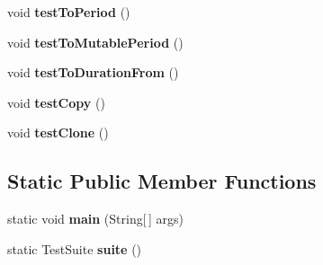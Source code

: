 \begin{DoxyCompactItemize}
\item 
\hypertarget{classorg_1_1joda_1_1time_1_1_test_mutable_period___basics_a323f8a3dbb74562bcab215f4ccd603d5}{void {\bfseries test\-To\-Period} ()}\label{classorg_1_1joda_1_1time_1_1_test_mutable_period___basics_a323f8a3dbb74562bcab215f4ccd603d5}

\item 
\hypertarget{classorg_1_1joda_1_1time_1_1_test_mutable_period___basics_af4a257fbc3ab58ab58cbe5362558a742}{void {\bfseries test\-To\-Mutable\-Period} ()}\label{classorg_1_1joda_1_1time_1_1_test_mutable_period___basics_af4a257fbc3ab58ab58cbe5362558a742}

\item 
\hypertarget{classorg_1_1joda_1_1time_1_1_test_mutable_period___basics_afa7a5cebedcc64f7df47779ed2d99afa}{void {\bfseries test\-To\-Duration\-From} ()}\label{classorg_1_1joda_1_1time_1_1_test_mutable_period___basics_afa7a5cebedcc64f7df47779ed2d99afa}

\item 
\hypertarget{classorg_1_1joda_1_1time_1_1_test_mutable_period___basics_a762ba0092b8c0a35b4cf0a05c886ce01}{void {\bfseries test\-Copy} ()}\label{classorg_1_1joda_1_1time_1_1_test_mutable_period___basics_a762ba0092b8c0a35b4cf0a05c886ce01}

\item 
\hypertarget{classorg_1_1joda_1_1time_1_1_test_mutable_period___basics_ade4f77447d0c49d2a1c1e15b13250ab7}{void {\bfseries test\-Clone} ()}\label{classorg_1_1joda_1_1time_1_1_test_mutable_period___basics_ade4f77447d0c49d2a1c1e15b13250ab7}

\end{DoxyCompactItemize}
\subsection*{Static Public Member Functions}
\begin{DoxyCompactItemize}
\item 
\hypertarget{classorg_1_1joda_1_1time_1_1_test_mutable_period___basics_ac838779bbfe5a418a5d513a6db38402c}{static void {\bfseries main} (String\mbox{[}$\,$\mbox{]} args)}\label{classorg_1_1joda_1_1time_1_1_test_mutable_period___basics_ac838779bbfe5a418a5d513a6db38402c}

\item 
\hypertarget{classorg_1_1joda_1_1time_1_1_test_mutable_period___basics_a7cbfc18d55e5cc67c7b43d90d4aed075}{static Test\-Suite {\bfseries suite} ()}\label{classorg_1_1joda_1_1time_1_1_test_mutable_period___basics_a7cbfc18d55e5cc67c7b43d90d4aed075}

\end{DoxyCompactItemize}
